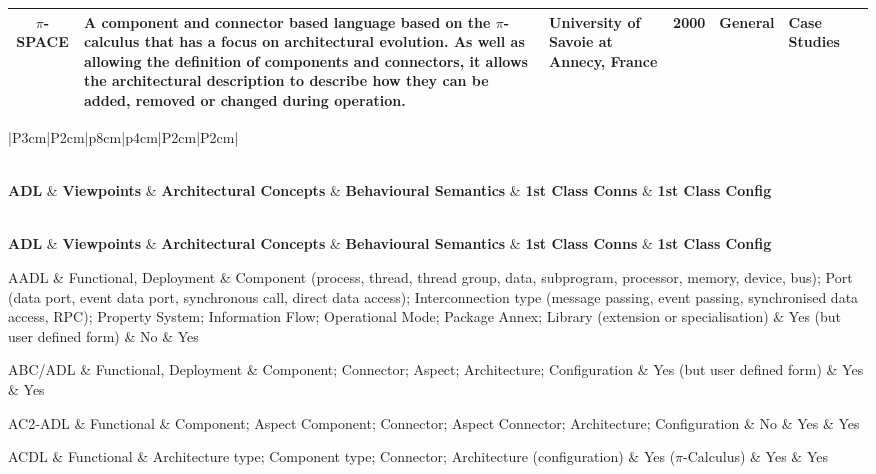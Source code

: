 \begin{landscape}
\begin{longtable}{|c|p{6cm}|p{3cm}|c|p{3cm}|p{2cm}|c|}
\hline
$\pi$-SPACE & A component and connector based language based on the $\pi$-calculus that has a focus on architectural evolution. As well as allowing the definition of components and connectors, it allows the architectural description to describe how they can be added, removed or changed during operation. & University of Savoie at Annecy, France & 2000 & General & Case Studies & \cite{chaudet2000-pispace} \\
\hline

\end{longtable}
\end{landscape}

\begin{landscape}
\footnotesize
\begin{longtable}{|P{3cm}|P{2cm}|p{8cm}|p{4cm}|P{2cm}|P{2cm}|} 
\caption{ADL Support for Architectural Concepts} \label{table:adl-concepts} \\
\hline
\textbf{ADL} & \textbf{Viewpoints} & \textbf{Architectural Concepts} & \textbf{ Behavioural Semantics} & \textbf{1st Class Conns} & \textbf{1st Class Config} \endfirsthead
\caption[]{ADL Support for Architectural Concepts} \\
\hline
\textbf{ADL} & \textbf{Viewpoints} & \textbf{Architectural Concepts} & \textbf{ Behavioural Semantics} & \textbf{1st Class Conns} & \textbf{1st Class Config} \endhead
\hline

AADL & Functional, Deployment & Component (process, thread, thread group, data, subprogram, processor, memory, device, bus); Port (data port, event data port, synchronous call, direct data access); Interconnection type (message passing, event passing, synchronised data access, RPC); Property System; Information Flow; Operational Mode; Package Annex; Library (extension or specialisation) & Yes (but user defined form) & No & Yes \\
\hline

ABC/ADL & Functional, Deployment & Component; Connector; Aspect; Architecture; Configuration & Yes (but user defined form) & Yes & Yes \\
\hline

AC2-ADL & Functional & Component; Aspect Component; Connector; Aspect Connector; Architecture; Configuration & No & Yes & Yes \\

\hline

ACDL & Functional & Architecture type; Component type; Connector; Architecture (configuration) & Yes ($\pi$-Calculus) & Yes & Yes \\ 
\hline


\end{longtable}
\end{landscape}
